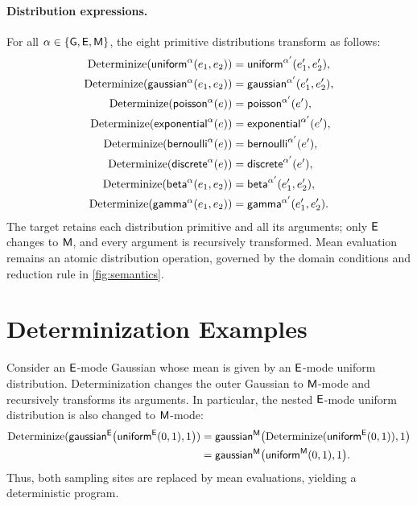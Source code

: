 \paragraph{Distribution expressions.}
For all $\alpha\in\{\mathsf{G},\mathsf{E},\mathsf{M}\}$, the eight primitive distributions transform as
follows:
\begin{align*}
  \operatorname{Determinize}(\mathsf{uniform}^{\alpha}(e_1,e_2))
    &= \mathsf{uniform}^{\alpha'}(e_1',e_2'),\\
  \operatorname{Determinize}(\mathsf{gaussian}^{\alpha}(e_1,e_2))
    &= \mathsf{gaussian}^{\alpha'}(e_1',e_2'),\\
  \operatorname{Determinize}(\mathsf{poisson}^{\alpha}(e))
    &= \mathsf{poisson}^{\alpha'}(e'),\\
  \operatorname{Determinize}(\mathsf{exponential}^{\alpha}(e))
    &= \mathsf{exponential}^{\alpha'}(e'),\\
  \operatorname{Determinize}(\mathsf{bernoulli}^{\alpha}(e))
    &= \mathsf{bernoulli}^{\alpha'}(e'),\\
  \operatorname{Determinize}(\mathsf{discrete}^{\alpha}(e))
    &= \mathsf{discrete}^{\alpha'}(e'),\\
  \operatorname{Determinize}(\mathsf{beta}^{\alpha}(e_1,e_2))
    &= \mathsf{beta}^{\alpha'}(e_1',e_2'),\\
  \operatorname{Determinize}(\mathsf{gamma}^{\alpha}(e_1,e_2))
    &= \mathsf{gamma}^{\alpha'}(e_1',e_2').
\end{align*}
The target retains each distribution primitive and all its arguments; only
$\mathsf{E}$ changes to $\mathsf{M}$, and every argument is recursively transformed.
Mean evaluation remains an atomic distribution operation, governed by the
domain conditions and reduction rule in \cref{fig:semantics}.

\section{Determinization Examples}\label{sec:appendix-determinization-examples}

\begin{example}
Consider an $\mathsf{E}$-mode Gaussian whose mean is given by an
$\mathsf{E}$-mode uniform distribution. Determinization changes the
outer Gaussian to $\mathsf{M}$-mode and recursively transforms its
arguments. In particular, the nested $\mathsf{E}$-mode uniform
distribution is also changed to $\mathsf{M}$-mode:
\begin{align*}
\operatorname{Determinize}(
  \mathsf{gaussian}^{\mathsf{E}}
    \bigl(\mathsf{uniform}^{\mathsf{E}}(0,1),1\bigr))
&=
\mathsf{gaussian}^{\mathsf{M}}
  \bigl(
    \operatorname{Determinize}(\mathsf{uniform}^{\mathsf{E}}(0,1)),
    1
  \bigr)
\\
&=
\mathsf{gaussian}^{\mathsf{M}}
  \bigl(
    \mathsf{uniform}^{\mathsf{M}}(0,1),
    1
  \bigr).
\end{align*}
Thus, both sampling sites are replaced by mean evaluations,
yielding a deterministic program.
\end{example}

